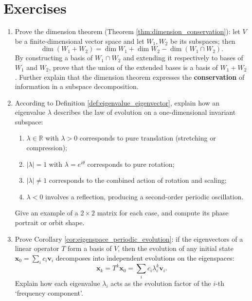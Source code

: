 \section*{Exercises}

\begin{enumerate}[leftmargin=3em, label=\textbf{Exercise \arabic*}]
    \item Prove the dimension theorem (Theorem \ref{thm:dimension_conservation}):
    let $V$ be a finite-dimensional vector space and let $W_1,W_2$ be its subspaces; then
    \[
    \dim(W_1+W_2)=\dim W_1+\dim W_2-\dim(W_1\cap W_2).
    \]
    By constructing a basis of $W_1\cap W_2$ and extending it respectively to bases of $W_1$ and $W_2$,
    prove that the union of the extended bases is a basis of $W_1+W_2$.
    Further explain that the dimension theorem expresses the \textbf{conservation} of information in a subspace decomposition.

    \item According to Definition \ref{def:eigenvalue_eigenvector}, explain how an eigenvalue $\lambda$ describes the law of evolution on a one-dimensional invariant subspace:
    \begin{enumerate}[label=(\roman*)]
        \item $\lambda\in\mathbb{R}$ with $\lambda>0$ corresponds to pure translation (stretching or compression);
        \item $|\lambda|=1$ with $\lambda=e^{i\theta}$ corresponds to pure rotation;
        \item $|\lambda|\neq1$ corresponds to the combined action of rotation and scaling;
        \item $\lambda<0$ involves a reflection, producing a second-order periodic oscillation.
    \end{enumerate}
    Give an example of a $2\times2$ matrix for each case, and compute its phase portrait or orbit shape.

    \item Prove Corollary \ref{cor:eigenspace_periodic_evolution}:
    if the eigenvectors of a linear operator $T$ form a basis of $V$, then the evolution of any initial state
    $\mathbf{x}_0=\sum_i c_i\mathbf{v}_i$ decomposes into independent evolutions on the eigenspaces:
    \[
    \mathbf{x}_k=T^k\mathbf{x}_0=\sum_i c_i\lambda_i^k\mathbf{v}_i.
    \]
    Explain how each eigenvalue $\lambda_i$ acts as the evolution factor of the $i$-th `frequency component'.


\end{enumerate}
